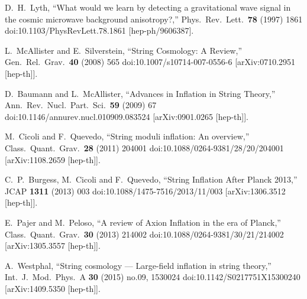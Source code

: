 \documentclass[11pt,a4paper]{article}
\begin{document}
\begin{thebibliography}{99}

  D.~H.~Lyth,
  ``What would we learn by detecting a gravitational wave signal in the cosmic microwave background anisotropy?,''
  Phys.\ Rev.\ Lett.\  {\bf 78} (1997) 1861
  doi:10.1103/PhysRevLett.78.1861
  [hep-ph/9606387].

  L.~McAllister and E.~Silverstein,
  ``String Cosmology: A Review,''
  Gen.\ Rel.\ Grav.\  {\bf 40} (2008) 565
  doi:10.1007/s10714-007-0556-6
  [arXiv:0710.2951 [hep-th]].

  D.~Baumann and L.~McAllister,
  ``Advances in Inflation in String Theory,''
  Ann.\ Rev.\ Nucl.\ Part.\ Sci.\  {\bf 59} (2009) 67
  doi:10.1146/annurev.nucl.010909.083524
  [arXiv:0901.0265 [hep-th]].

  M.~Cicoli and F.~Quevedo,
  ``String moduli inflation: An overview,''
  Class.\ Quant.\ Grav.\  {\bf 28} (2011) 204001
  doi:10.1088/0264-9381/28/20/204001
  [arXiv:1108.2659 [hep-th]].
	
  C.~P.~Burgess, M.~Cicoli and F.~Quevedo,
  ``String Inflation After Planck 2013,''
  JCAP {\bf 1311} (2013) 003
  doi:10.1088/1475-7516/2013/11/003
  [arXiv:1306.3512 [hep-th]].
	
  E.~Pajer and M.~Peloso,
  ``A review of Axion Inflation in the era of Planck,''
  Class.\ Quant.\ Grav.\  {\bf 30} (2013) 214002
  doi:10.1088/0264-9381/30/21/214002
  [arXiv:1305.3557 [hep-th]].

  A.~Westphal,
  ``String cosmology — Large-field inflation in string theory,''
  Int.\ J.\ Mod.\ Phys.\ A {\bf 30} (2015) no.09,  1530024
  doi:10.1142/S0217751X15300240
  [arXiv:1409.5350 [hep-th]].


\end{thebibliography}
\end{document}
